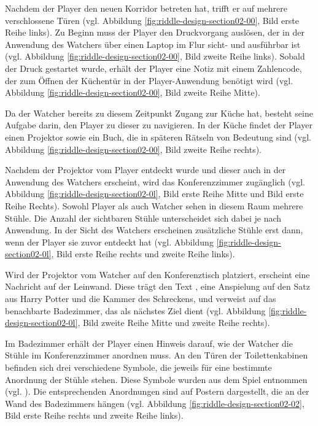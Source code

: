 Nachdem der Player den neuen Korridor betreten hat, trifft er auf mehrere verschlossene Türen (vgl. Abbildung \ref{fig:riddle-design-section02-00}, Bild erste Reihe links). Zu Beginn muss der Player den Druckvorgang auslösen, der in der Anwendung des Watchers über einen Laptop im Flur sicht- und ausführbar ist (vgl. Abbildung \ref{fig:riddle-design-section02-00}, Bild zweite Reihe links). Sobald der Druck gestartet wurde, erhält der Player eine Notiz mit einem Zahlencode, der zum Öffnen der Küchentür in der Player-Anwendung benötigt wird (vgl. Abbildung \ref{fig:riddle-design-section02-00}, Bild zweite Reihe Mitte).

Da der Watcher bereits zu diesem Zeitpunkt Zugang zur Küche hat, besteht seine Aufgabe darin, den Player zu dieser zu navigieren. In der Küche findet der Player einen Projektor sowie ein Buch, die in späteren Rätseln von Bedeutung sind (vgl. Abbildung \ref{fig:riddle-design-section02-00}, Bild zweite Reihe rechts). 

Nachdem der Projektor vom Player entdeckt wurde und dieser auch in der Anwendung des Watchers erscheint, wird das Konferenzzimmer zugänglich (vgl. Abbildung \ref{fig:riddle-design-section02-0l}, Bild erste Reihe Mitte und Bild erste Reihe Rechts). Sowohl Player als auch Watcher sehen in diesem Raum mehrere Stühle. Die Anzahl der sichtbaren Stühle unterscheidet sich dabei je nach Anwendung. In der Sicht des Watchers erscheinen zusätzliche Stühle erst dann, wenn der Player sie zuvor entdeckt hat  (vgl. Abbildung \ref{fig:riddle-design-section02-0l}, Bild erste Reihe rechts und zweite Reihe links).

Wird der Projektor vom Watcher auf den Konferenztisch platziert, erscheint eine Nachricht auf der Leinwand. Diese trägt den Text , eine Anspielung auf den Satz aus Harry Potter und die Kammer des Schreckens, und verweist auf das benachbarte Badezimmer, das als nächstes Ziel dient (vgl. Abbildung \ref{fig:riddle-design-section02-0l}, Bild zweite Reihe Mitte und zweite Reihe rechts).

Im Badezimmer erhält der Player einen Hinweis darauf, wie der Watcher die Stühle im Konferenzzimmer anordnen muss. An den Türen der Toilettenkabinen befinden sich drei verschiedene Symbole, die jeweils für eine bestimmte Anordnung der Stühle stehen. Diese Symbole wurden aus dem Spiel  entnommen (vgl. \citealp{total_mayhem_games_we_2018}). Die entsprechenden Anordnungen sind auf Postern dargestellt, die an der Wand des Badezimmers hängen (vgl. Abbildung \ref{fig:riddle-design-section02-02}, Bild erste Reihe rechts und zweite Reihe links).

